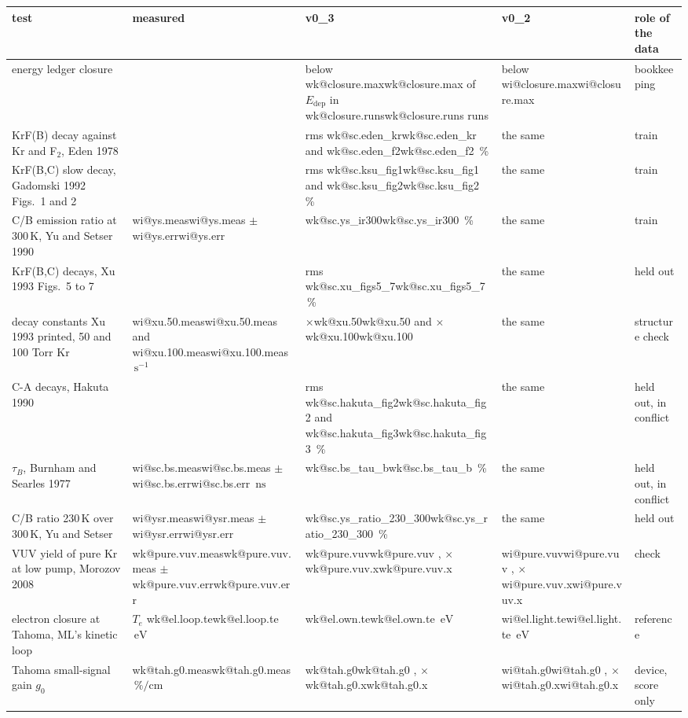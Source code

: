\documentclass[11pt]{article}
\makeatletter
\newcommand\wi[1]{\ifcsname wi@#1\endcsname\csname wi@#1\endcsname
  \else\errmessage{no v0_2 number '#1'. Rerun make_overview_v0_2.py}\fi}
\newcommand\wk[1]{\ifcsname wk@#1\endcsname\csname wk@#1\endcsname
  \else\errmessage{no v0_3 number '#1'. Rerun make_overview_v0_3.py}\fi}
\newcommand{\unit}[1]{\ensuremath{\,\mathrm{#1}}}
\newcommand{\Edep}{\ensuremath{E_\mathrm{dep}}}
\newcommand{\x}[1]{\ensuremath{\times}#1}
\makeatother
\begin{document}
\begin{table}[h]
\centering\footnotesize
\renewcommand{\arraystretch}{1.12}
\begin{tabularx}{\linewidth}{@{}>{\raggedright\arraybackslash}X
  >{\raggedright\arraybackslash}p{2.3cm}>{\raggedright\arraybackslash}p{2.3cm}
  >{\raggedright\arraybackslash}p{2.3cm}>{\raggedright\arraybackslash}p{1.9cm}@{}}
\toprule
test & measured & v0\_3 & v0\_2 & role of the data\\
\midrule
energy ledger closure & & below \wk{closure.max} of \Edep{} in
  \wk{closure.runs} runs & below \wi{closure.max} & bookkeeping\\
KrF(B) decay against Kr and F$_2$, Eden 1978 & & rms \wk{sc.eden_kr} and
  \wk{sc.eden_f2}\,\% & the same & train\\
KrF(B,C) slow decay, Gadomski 1992 Figs.\ 1 and 2 & & rms
  \wk{sc.ksu_fig1} and \wk{sc.ksu_fig2}\,\% & the same & train\\
C/B emission ratio at 300\unit{K}, Yu and Setser 1990 & \wi{ys.meas}
  $\pm$ \wi{ys.err} & \wk{sc.ys_ir300}\,\% & the same & train\\
KrF(B,C) decays, Xu 1993 Figs.\ 5 to 7 & & rms \wk{sc.xu_figs5_7}\,\% &
  the same & held out\\
decay constants Xu 1993 printed, 50 and 100 Torr Kr & \wi{xu.50.meas}
  and \wi{xu.100.meas}\unit{s^{-1}} & \x{\wk{xu.50}} and \x{\wk{xu.100}} &
  the same & structure check\\
C-A decays, Hakuta 1990 & & rms \wk{sc.hakuta_fig2} and
  \wk{sc.hakuta_fig3}\,\% & the same & held out, in conflict\\
$\tau_B$, Burnham and Searles 1977 & \wi{sc.bs.meas} $\pm$
  \wi{sc.bs.err}\unit{ns} & \wk{sc.bs_tau_b}\,\% & the same & held out, in
  conflict\\
C/B ratio 230\unit{K} over 300\unit{K}, Yu and Setser & \wi{ysr.meas}
  $\pm$ \wi{ysr.err} & \wk{sc.ys_ratio_230_300}\,\% & the same & held out\\
\midrule
VUV yield of pure Kr at low pump, Morozov 2008 & \wk{pure.vuv.meas}
  $\pm$ \wk{pure.vuv.err} & \wk{pure.vuv}, \x{\wk{pure.vuv.x}} &
  \wi{pure.vuv}, \x{\wi{pure.vuv.x}} & check\\
electron closure at Tahoma, ML's kinetic loop & $T_e$
  \wk{el.loop.te}\unit{eV} & \wk{el.own.te}\unit{eV} &
  \wi{el.light.te}\unit{eV} & reference\\
\midrule
Tahoma small-signal gain $g_0$ & \wk{tah.g0.meas}\unit{\%/cm} &
  \wk{tah.g0}, \x{\wk{tah.g0.x}} & \wi{tah.g0}, \x{\wi{tah.g0.x}} &
  device, score only\\

\end{tabularx}
\end{table}
\end{document}
